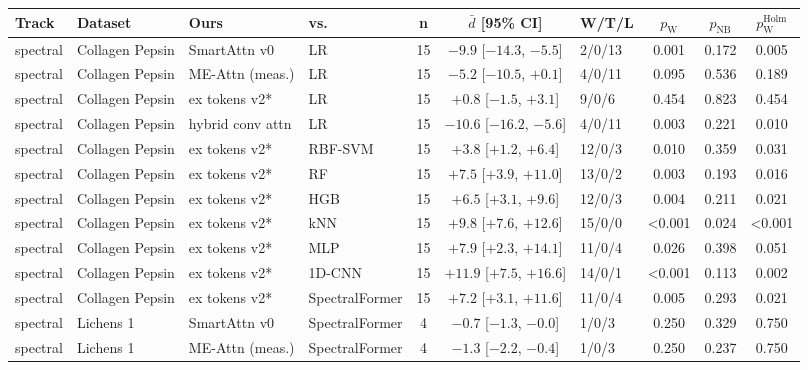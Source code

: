 \small
\begin{tabular}{llllcclccc}
\toprule
Track & Dataset & Ours & vs. & n & $\bar d$ [95\% CI] & W/T/L & $p_{\mathrm{W}}$ & $p_{\mathrm{NB}}$ & $p_{\mathrm{W}}^{\mathrm{Holm}}$ \\
\midrule
spectral & Collagen Pepsin & SmartAttn v0 & LR & 15 & $-9.9$ [$-14.3$, $-5.5$] & 2/0/13 & 0.001 & 0.172 & 0.005 \\
spectral & Collagen Pepsin & ME-Attn (meas.) & LR & 15 & $-5.2$ [$-10.5$, $+0.1$] & 4/0/11 & 0.095 & 0.536 & 0.189 \\
spectral & Collagen Pepsin & ex tokens v2* & LR & 15 & $+0.8$ [$-1.5$, $+3.1$] & 9/0/6 & 0.454 & 0.823 & 0.454 \\
spectral & Collagen Pepsin & hybrid conv attn & LR & 15 & $-10.6$ [$-16.2$, $-5.6$] & 4/0/11 & 0.003 & 0.221 & 0.010 \\
spectral & Collagen Pepsin & ex tokens v2* & RBF-SVM & 15 & $+3.8$ [$+1.2$, $+6.4$] & 12/0/3 & 0.010 & 0.359 & 0.031 \\
spectral & Collagen Pepsin & ex tokens v2* & RF & 15 & $+7.5$ [$+3.9$, $+11.0$] & 13/0/2 & 0.003 & 0.193 & 0.016 \\
spectral & Collagen Pepsin & ex tokens v2* & HGB & 15 & $+6.5$ [$+3.1$, $+9.6$] & 12/0/3 & 0.004 & 0.211 & 0.021 \\
spectral & Collagen Pepsin & ex tokens v2* & kNN & 15 & $+9.8$ [$+7.6$, $+12.6$] & 15/0/0 & <0.001 & 0.024 & <0.001 \\
spectral & Collagen Pepsin & ex tokens v2* & MLP & 15 & $+7.9$ [$+2.3$, $+14.1$] & 11/0/4 & 0.026 & 0.398 & 0.051 \\
spectral & Collagen Pepsin & ex tokens v2* & 1D-CNN & 15 & $+11.9$ [$+7.5$, $+16.6$] & 14/0/1 & <0.001 & 0.113 & 0.002 \\
spectral & Collagen Pepsin & ex tokens v2* & SpectralFormer & 15 & $+7.2$ [$+3.1$, $+11.6$] & 11/0/4 & 0.005 & 0.293 & 0.021 \\
\midrule
spectral & Lichens 1 & SmartAttn v0 & SpectralFormer & 4 & $-0.7$ [$-1.3$, $-0.0$] & 1/0/3 & 0.250 & 0.329 & 0.750 \\
spectral & Lichens 1 & ME-Attn (meas.) & SpectralFormer & 4 & $-1.3$ [$-2.2$, $-0.4$] & 1/0/3 & 0.250 & 0.237 & 0.750 \\

\end{tabular}
